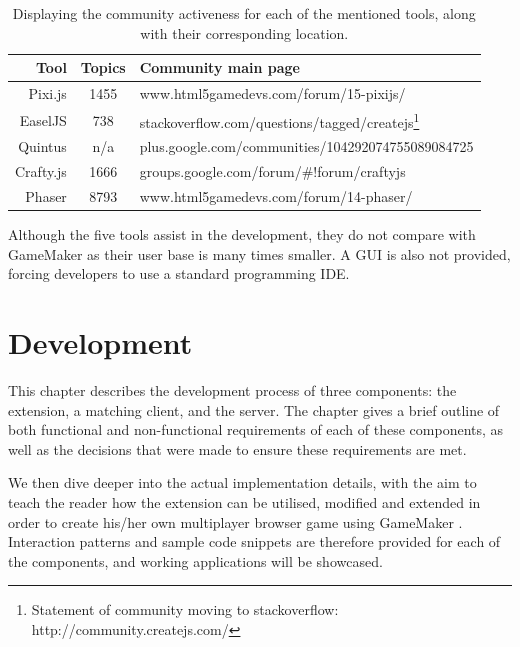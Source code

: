 \documentclass[bsc, 12pt, twoside, singlespacing, parskip, abbrevs, notimes, normalheadings, logo, deptreport]{styles/infthesis}
\begin{document}
\begin{table}[H]
\centering
  \begin{tabular}{ | r || c | l | }
  \hline
  	\textbf{Tool}			& \textbf{Topics}	& \textbf{Community main page}	\\ \hline\hline
    Pixi.js			& 1455		& www.html5gamedevs.com/forum/15-pixijs/		\\ \hline
    EaselJS			& 738		& stackoverflow.com/questions/tagged/createjs\footnote{Statement of community moving to stackoverflow: http://community.createjs.com/}		\\ \hline
   	Quintus			& n/a		& plus.google.com/communities/104292074755089084725		\\ \hline
    Crafty.js		& 1666		& groups.google.com/forum/\#!forum/craftyjs		\\ \hline
    Phaser			& 8793		& www.html5gamedevs.com/forum/14-phaser/		\\ \hline
  \end{tabular}
  \caption{Displaying the community activeness for each of the mentioned tools, along with their corresponding location.}
\label{table:JS_Framework_Libraries}
\end{table}


Although the five tools assist in the development, they do not compare with GameMaker as their user base is many times smaller. A GUI is also not provided, forcing developers to use a standard programming IDE.


\chapter{Development}
This chapter describes the development process of three components: the extension, a matching client, and the server. The chapter gives a brief outline of both functional and non-functional requirements of each of these components, as well as the decisions that were made to ensure these requirements are met.

We then dive deeper into the actual implementation details, with the aim to teach the reader how the extension can be utilised, modified and extended in order to create his/her own multiplayer browser game using GameMaker \cite{SE_7_Principles}. Interaction patterns and sample code snippets are therefore provided for each of the components, and working applications will be showcased.
\end{document}
